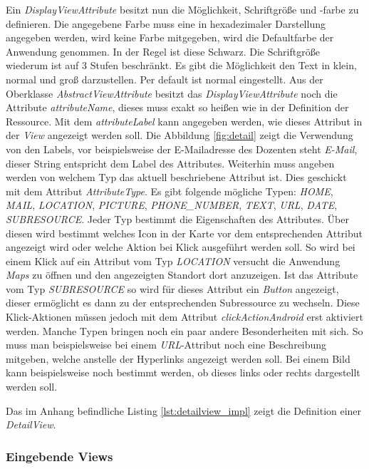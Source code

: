 Ein \textit{DisplayViewAttribute} besitzt nun die Möglichkeit, Schriftgröße und -farbe zu definieren. Die angegebene Farbe muss eine in hexadezimaler Darstellung angegeben werden, wird keine Farbe mitgegeben, wird die Defaultfarbe der Anwendung genommen. In der Regel ist diese Schwarz.  Die Schriftgröße wiederum ist auf 3 Stufen beschränkt. Es gibt die Möglichkeit den Text in klein, normal und groß darzustellen. Per default ist normal eingestellt. Aus der Oberklasse \textit{AbstractViewAttribute} besitzt das \textit{DisplayViewAttribute} noch die Attribute \textit{attributeName}, dieses muss exakt so heißen wie in der Definition der Ressource.
Mit dem \textit{attributeLabel} kann angegeben werden, wie dieses Attribut in der \textit{View} angezeigt werden soll. Die Abbildung \ref{fig:detail} zeigt die Verwendung von den Labels, vor beispielsweise der E-Mailadresse des Dozenten steht \textit{E-Mail}, dieser String entspricht dem Label des Attributes. Weiterhin muss angeben werden von welchem Typ das aktuell beschriebene Attribut ist.
Dies geschickt mit dem Attribut \textit{AttributeType}. Es gibt folgende mögliche Typen: \textit{HOME}, \textit{MAIL}, \textit{LOCATION}, \textit{PICTURE}, \textit{PHONE\_NUMBER}, \textit{TEXT}, \textit{URL}, \textit{DATE}, \textit{SUBRESOURCE}. Jeder Typ bestimmt die Eigenschaften des Attributes. Über diesen wird bestimmt welches Icon in der Karte vor dem entsprechenden Attribut angezeigt wird oder welche Aktion bei Klick ausgeführt werden soll. So wird bei einem Klick auf ein Attribut vom Typ \textit{LOCATION} versucht die Anwendung \textit{Maps} zu öffnen und den angezeigten Standort dort anzuzeigen. Ist das Attribute vom Typ \textit{SUBRESOURCE} so wird für dieses Attribut ein \textit{Button} angezeigt, dieser ermöglicht es dann zu der entsprechenden Subressource zu wechseln. Diese Klick-Aktionen müssen jedoch mit dem Attribut \textit{clickActionAndroid} erst aktiviert werden.
Manche Typen bringen noch ein paar andere Besonderheiten mit sich. So muss man beispielsweise bei einem \textit{URL}-Attribut noch eine Beschreibung mitgeben, welche anstelle der Hyperlinks angezeigt werden soll. Bei einem Bild kann beispielsweise noch bestimmt werden, ob dieses links oder rechts dargestellt werden soll. 

Das im Anhang befindliche Listing \ref{lst:detailview_impl} zeigt die Definition einer \textit{DetailView}.

\subsubsection{Eingebende Views}


